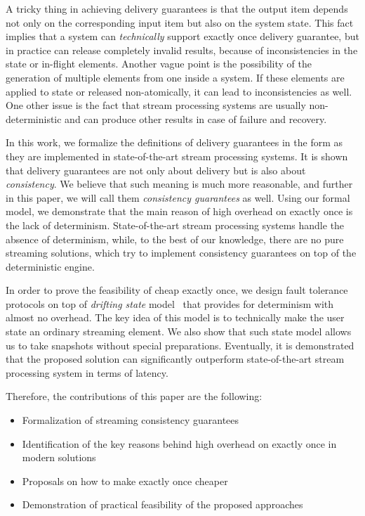 A tricky thing in achieving delivery guarantees is that the output item depends not only on the corresponding input item but also on the system state. This fact implies that a system can {\em technically} support exactly once delivery guarantee, but in practice can release completely invalid results, because of inconsistencies in the state or in-flight elements. Another vague point is the possibility of the generation of multiple elements from one inside a system. If these elements are applied to state or released non-atomically, it can lead to inconsistencies as well. One other issue is the fact that stream processing systems are usually non-deterministic and can produce other results in case of failure and recovery. 

In this work, we formalize the definitions of delivery guarantees in the form as they are implemented in state-of-the-art stream processing systems. It is shown that delivery guarantees are not only about delivery but is also about {\em consistency}. We believe that such meaning is much more reasonable, and further in this paper, we will call them {\em consistency guarantees} as well. Using our formal model, we demonstrate that the main reason of high overhead on exactly once is the lack of determinism. State-of-the-art stream processing systems handle the absence of determinism, while, to the best of our knowledge, there are no pure streaming solutions, which try to implement consistency guarantees on top of the deterministic engine.

In order to prove the feasibility of cheap exactly once, we design fault tolerance protocols on top of {\em drifting state} model~\cite{we2018adbis} that provides for determinism with almost no overhead. The key idea of this model is to technically make the user state an ordinary streaming element. We also show that such state model allows us to take snapshots without special preparations. Eventually, it is demonstrated that the proposed solution can significantly outperform state-of-the-art stream processing system in terms of latency.

Therefore, the contributions of this paper are the following: 
\begin{itemize}
    \item Formalization of streaming consistency guarantees 
    \item Identification of the key reasons behind high overhead on exactly once in modern solutions 
    \item Proposals on how to make exactly once cheaper
    \item Demonstration of practical feasibility of the proposed approaches
\end{itemize}

